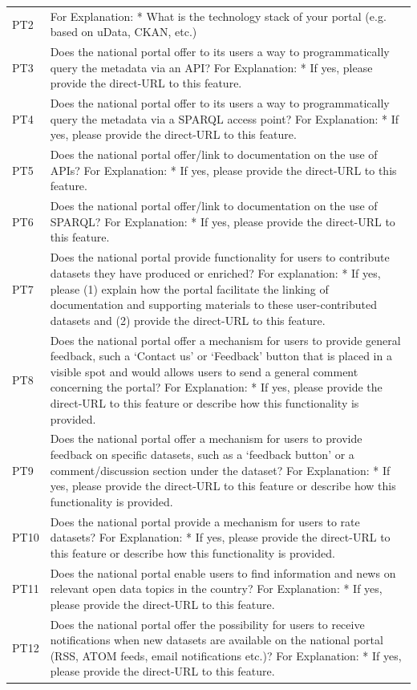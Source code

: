 {\begin{longtable}[]{@{}
  L{0.1386}
  L{0.8614}@{}}
PT2 & For Explanation: * What is the technology stack of your portal (e.g. based on uData, CKAN, etc.) \\
PT3 & Does the national portal offer to its users a way to programmatically query the metadata via an API? For Explanation: * If yes, please provide the direct-URL to this feature. \\
PT4 & Does the national portal offer to its users a way to programmatically query the metadata via a SPARQL access point? For Explanation: * If yes, please provide the direct-URL to this feature. \\
PT5 & Does the national portal offer/link to documentation on the use of APIs? For Explanation: * If yes, please provide the direct-URL to this feature. \\
PT6 & Does the national portal offer/link to documentation on the use of SPARQL? For Explanation: * If yes, please provide the direct-URL to this feature. \\
PT7 & Does the national portal provide functionality for users to contribute datasets they have produced or enriched? For explanation: * If yes, please (1) explain how the portal facilitate the linking of documentation and supporting materials to these user-contributed datasets and (2) provide the direct-URL to this feature. \\
PT8 & Does the national portal offer a mechanism for users to provide general feedback, such a `Contact us' or `Feedback' button that is placed in a visible spot and would allows users to send a general comment concerning the portal? For Explanation: * If yes, please provide the direct-URL to this feature or describe how this functionality is provided. \\
PT9 & Does the national portal offer a mechanism for users to provide feedback on specific datasets, such as a `feedback button' or a comment/discussion section under the dataset? For Explanation: * If yes, please provide the direct-URL to this feature or describe how this functionality is provided. \\
PT10 & Does the national portal provide a mechanism for users to rate datasets? For Explanation: * If yes, please provide the direct-URL to this feature or describe how this functionality is provided. \\
PT11 & Does the national portal enable users to find information and news on relevant open data topics in the country? For Explanation: * If yes, please provide the direct-URL to this feature. \\
PT12 & Does the national portal offer the possibility for users to receive notifications when new datasets are available on the national portal (RSS, ATOM feeds, email notifications etc.)? For Explanation: * If yes, please provide the direct-URL to this feature. \\

\end{longtable}}
